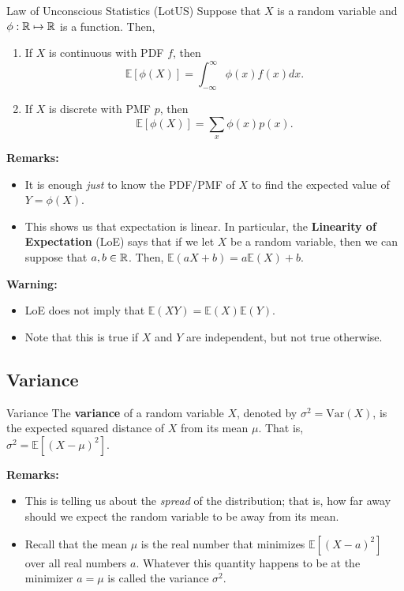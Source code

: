 \documentclass[letterpaper]{article}
\begin{document}
\begin{theorem}{Law of Unconscious Statistics (LotUS)}{}
    Suppose that $X$ is a random variable and $\phi: \mathbb{R} \mapsto \mathbb{R}$ is a function. Then, 
    \begin{enumerate}
        \item If $X$ is continuous with PDF $f$, then 
        \[\mathbb{E}[\phi(X)] = \int_{-\infty}^{\infty} \phi(x) f(x) dx.\]

        \item If $X$ is discrete with PMF $p$, then 
        \[\mathbb{E}[\phi(X)] = \sum_{x} \phi(x) p(x).\]
    \end{enumerate}
\end{theorem}
\textbf{Remarks:} 
\begin{itemize}
    \item It is enough \emph{just} to know the PDF/PMF of $X$ to find the expected value of $Y = \phi(X)$.
    \item This shows us that expectation is linear. In particular, the \textbf{Linearity of Expectation} (LoE) says that if we let $X$ be a random variable, then we can suppose that $a, b \in \mathbb{R}$. Then, $\mathbb{E}(aX + b) = a\mathbb{E}(X) + b$. 
\end{itemize}
\textbf{Warning:}
\begin{itemize}
    \item LoE does not imply that $\mathbb{E}(XY) = \mathbb{E}(X) \mathbb{E}(Y)$. 
    \item Note that this is true if $X$ and $Y$ are independent, but not true otherwise. 
\end{itemize}

\subsection{Variance}
\begin{definition}{Variance}{}
    The \textbf{variance} of a random variable $X$, denoted by $\sigma^2 = \text{Var}(X)$, is the expected squared distance of $X$ from its mean $\mu$. That is, $\sigma^2 = \mathbb{E}[(X - \mu)^2]$. 
\end{definition}
\textbf{Remarks:}
\begin{itemize}
    \item This is telling us about the \emph{spread} of the distribution; that is, how far away should we expect the random variable to be away from its mean. 
    \item Recall that the mean $\mu$ is the real number that minimizes $\mathbb{E}[(X - a)^2]$ over all real numbers $a$. Whatever this quantity happens to be at the minimizer $a = \mu$ is called the variance $\sigma^2$. 
\end{itemize}
\end{document}
